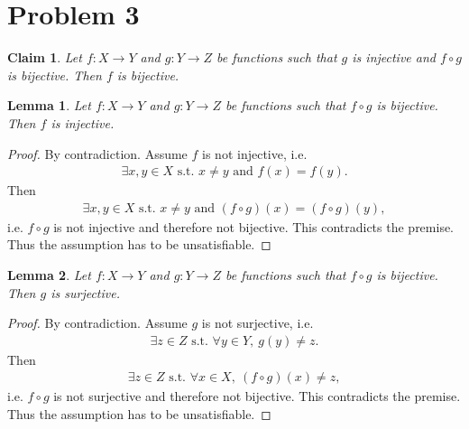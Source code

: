 \documentclass{article}
\newcommand{\st}{\text{ s.t. }}
\newtheorem{claim}[section]{Claim}
\newtheorem{lemma}{Lemma}[section]
\begin{document}
\section*{Problem 3}
\begin{claim}
  Let $f:X\to Y$ and $g:Y\to Z$ be functions such that $g$ is injective and $f\circ g$ is bijective. Then $f$ is bijective.
\end{claim}
\begin{adjustwidth}{2em}{0pt}
  \begin{lemma}
    \label{l1}
    Let $f:X\to Y$ and $g:Y\to Z$ be functions such that $f\circ g$ is bijective. Then $f$ is injective.
  \end{lemma}
  \begin{proof}
    By contradiction. Assume $f$ is not injective, i.e. 
    \begin{align*}
      \exists x,y \in X \st x \not= y \text{ and } f(x) = f(y).
    \end{align*}
    Then
    \begin{align*}
      \exists x,y \in X \st x \not= y \text{ and } \left(f\circ g\right)(x) = \left(f\circ g\right)(y),
    \end{align*}
    i.e. $f\circ g$ is not injective and therefore not bijective.
    This contradicts the premise.
    Thus the assumption has to be unsatisfiable.
  \end{proof}
  \begin{lemma}
    \label{l2}
    Let $f:X\to Y$ and $g:Y\to Z$ be functions such that $f\circ g$ is bijective. Then $g$ is surjective.
  \end{lemma}
  \begin{proof}
    By contradiction. Assume $g$ is not surjective, i.e.
    \begin{align*}
      \exists z \in Z \st \forall y \in Y,\:g(y) \not= z.
    \end{align*}
    Then
    \begin{align*}
      \exists z \in Z \st \forall x \in X,\: \left(f\circ g\right)(x) \not= z,
    \end{align*}
    i.e. $f\circ g$ is not surjective and therefore not bijective.
    This contradicts the premise.
    Thus the assumption has to be unsatisfiable.
  \end{proof}
\end{adjustwidth}
\end{document}
